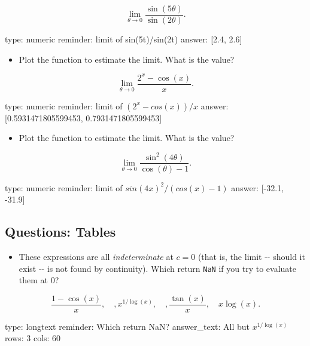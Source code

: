 \documentclass[12pt]{article}
\begin{document}
\[
\lim_{\theta \rightarrow 0} \frac{\sin(5\theta)}{\sin(2\theta)}.
\]

\begin{answer}
    type: numeric
    reminder: limit of sin(5t)/sin(2t)
    answer: [2.4, 2.6]

\end{answer}

\begin{itemize}
\itemsep1pt\parskip0pt
\item
  Plot the function to estimate the limit. What is the value?
\end{itemize}

\[
\lim_{\theta \rightarrow 0} \frac{2^x - \cos(x)}{x}.
\]

\begin{answer}
    type: numeric
    reminder: limit of \( (2^x  - cos(x))/x \)
    answer: [0.5931471805599453, 0.7931471805599453]

\end{answer}

\begin{itemize}
\itemsep1pt\parskip0pt
\item
  Plot the function to estimate the limit. What is the value?
\end{itemize}

\[
\lim_{\theta \rightarrow 0} \frac{\sin^2(4\theta)}{\cos(\theta) - 1}.
\]

\begin{answer}
    type: numeric
    reminder: limit of \( sin(4x)^2 / (cos(x) - 1) \)
    answer: [-32.1, -31.9]

\end{answer}

\subsection{Questions: Tables}

\begin{itemize}
\itemsep1pt\parskip0pt
\item
  These expressions are all \emph{indeterminate} at $c=0$ (that is, the
  limit -{}- should it exist -{}- is not found by continuity). Which
  return \texttt{NaN} if you try to evaluate them at $0$?
\end{itemize}

\[
\frac{1-\cos(x)}{x}, \quad, x^{1/\log(x)}, \quad, \frac{\tan(x)}{x},\quad x\log(x).
\]

\begin{answer}
type: longtext
reminder: Which return NaN?
answer_text: All but \( x^{1/\log(x)} \) 
rows: 3
cols: 60
\end{answer}
\end{document}
